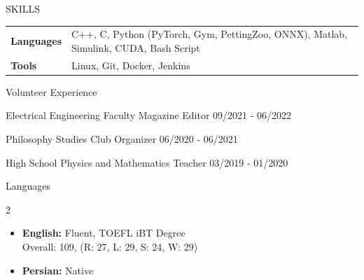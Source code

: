 \documentclass{resume} %
\begin{document}
\begin{rSection}{SKILLS}
\begin{tabular}{ @{} >{\bfseries}l @{\hspace{6ex}} l }
Languages & C++, C, Python (PyTorch, Gym, PettingZoo, ONNX), Matlab, Simulink, CUDA, Bash Script\\
Tools & Linux, Git, Docker, Jenkins\\
\end{tabular}
\end{rSection}

\begin{rSection}{Volunteer Experience}
\vspace{-1.25em}
\item Electrical Engineering Faculty Magazine Editor \hfill 09/2021 - 06/2022
\item Philosophy Studies Club Organizer \hfill 06/2020 - 06/2021
\item High School Physics and Mathematics Teacher \hfill 03/2019 - 01/2020
\end{rSection} 

\begin{rSection}{Languages}
\begin{multicols}{2}
\begin{itemize}
    \itemsep -3pt {} 
    \item {\textbf{English:} Fluent, TOEFL iBT Degree \\
            Overall: 109, (R: 27, L: 29, S: 24, W: 29)}
    \item \textbf{Persian:} Native
\end{itemize}
\end{multicols}
\vspace*{-12pt}
\end{rSection}
\end{document}
